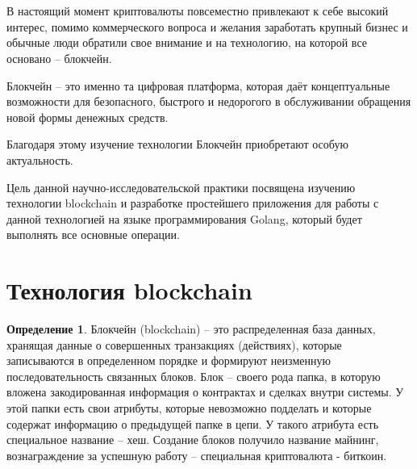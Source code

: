 \documentclass[och, master, pract]{SCWorks_fix}
\author{Sharov Alex}
\theoremstyle{plain}
\theoremstyle{plain}
\theoremstyle{plain}
\theoremstyle{definition}
\newtheorem{defn}{Определение}
\begin{document}
%
\setcounter{tocdepth}{2}




​
\author{Шарова Александра Вадимовича}
​
​
​
\date{2019}
\maketitle
\tableofcontents

\intro


В настоящий момент криптовалюты повсеместно привлекают к себе высокий интерес, помимо коммерческого вопроса и желания заработать крупный бизнес и обычные люди обратили свое внимание и на технологию, на которой все основано – блокчейн.

Блокчейн – это именно та цифровая платформа, которая даёт концептуальные возможности для безопасного, быстрого и недорогого в обслуживании обращения новой формы денежных средств.\cite{bib:block:1}

Благодаря этому изучение технологии Блокчейн приобретают особую актуальность.

Цель данной научно-исследовательской практики посвящена изучению технологии blockchain и разработке простейшего приложения для работы с данной технологией на языке программирования Golang, который будет выполнять все основные операции.

\section{Технология blockchain}

\begin{defn}
Блокчейн (blockchain) – это распределенная база данных, хранящая данные о совершенных транзакциях (действиях), которые записываются в определенном порядке и формируют неизменную последовательность связанных блоков. Блок – своего рода папка, в которую вложена закодированная информация о контрактах и сделках внутри системы. У этой папки есть свои атрибуты, которые невозможно подделать и которые содержат информацию о предыдущей папке в цепи. У такого атрибута есть специальное название – хеш. Создание блоков получило название майнинг, вознаграждение за успешную работу – специальная криптовалюта - биткоин. \cite{bib:block:4}
\end{defn}
\end{document}
